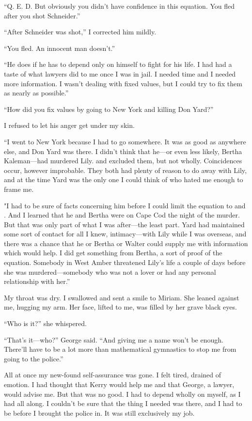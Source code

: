 \documentclass{novel}
\begin{document}
“Q. E. D. But obviously you didn’t have confidence in this equation. You fled after you shot Schneider.”

“After Schneider was shot,” I corrected him mildly.

“You fled. An innocent man doesn’t.”

“He does if he has to depend only on himself to fight for his life. I had had a taste of what lawyers did to me once I was in jail. I needed time and I needed more information. I wasn’t dealing with fixed values, but I could try to fix them as nearly as possible.”

“How did you fix values by going to New York and killing Don Yard?”

\scenestars

I refused to let his anger get under my skin.

“I went to New York because I had to go somewhere. It was as good as anywhere else, and Don Yard was there. I didn’t think that he—or even less likely, Bertha Kaleman—had murdered Lily.  and  excluded them, but not wholly. Coincidences occur, however improbable. They both had plenty of reason to do away with Lily, and at the time Yard was the only one I could think of who hated me enough to frame me.

"I had to be sure of facts concerning him before I could limit the equation to  and . And I learned that he and Bertha were on Cape Cod the night of the murder. But that was only part of what I was after—the least part. Yard had maintained some sort of contact for all I knew, intimacy—with Lily while I was overseas, and there was a chance that he or Bertha or Walter could supply me with information which would help. I did get something from Bertha, a sort of proof of the equation. Somebody in West Amber threatened Lily’s life a couple of days before she was murdered—somebody who was not a lover or had any personal relationship with her.”

My throat was dry. I swallowed and sent a smile to Miriam. She leaned against me, hugging my arm. Her face, lifted to me, was filled by her grave black eyes.

“Who is it?” she whispered.

“That’s it—who?” George said. “And giving me a name won’t be enough. There’ll have to be a lot more than mathematical gymnastics to stop me from going to the police.”

All at once my new-found self-assurance was gone. I felt tired, drained of emotion. I had thought that Kerry would help me and that George, a lawyer, would advise me. But that was no good. I had to depend wholly on myself, as I had all along. I couldn’t be sure that the thing I needed was there, and I had to be before I brought the police in. It was still exclusively my job.
\end{document}
